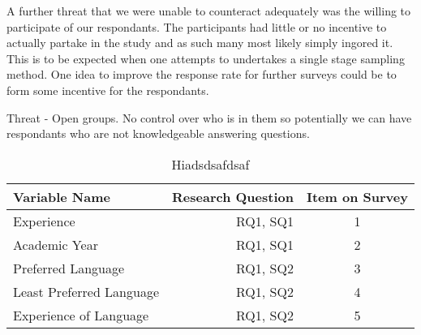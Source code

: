 \documentclass[times, 10pt,twocolumn]{IEEEtran}
\begin{document}
A further threat that we were unable to counteract adequately was the willing to participate of our respondants. The participants had little or no incentive to actually partake in the study and as such many most likely simply ingored it. This is to be expected when one attempts to undertakes a single stage sampling method. One idea to improve the response rate for further surveys could be to form some incentive for the respondants.

Threat - Open groups. No control over who is in them so potentially we can have respondants who are not knowledgeable answering questions.




\begin{table}[ht]
  \centering
  \begin{tabular}{| l | r | c |}
  	\hline
  	\textbf{Variable Name} & \textbf{Research Question} & \textbf{Item on Survey} \\ \hline
  	Experience & RQ1, SQ1 & 1 \\ \hline
    Academic Year & RQ1, SQ1 & 2 \\ \hline
  	Preferred Language & RQ1, SQ2 & 3 \\ \hline
  	Least Preferred Language & RQ1, SQ2& 4 \\  \hline
  	Experience of Language & RQ1, SQ2 & 5 \\ 
  	\hline
	\end{tabular}
  \caption{ Hiadsdsafdsaf}
\end{table}
\end{document}
